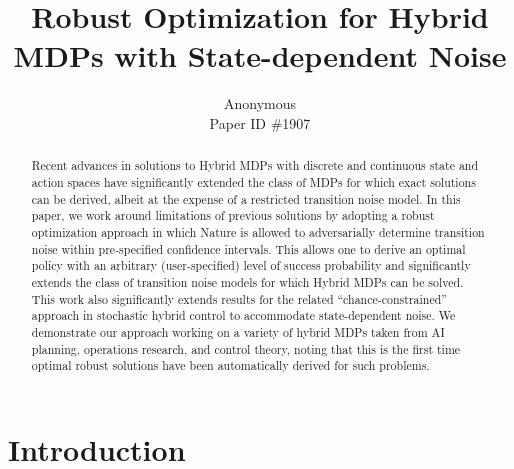 \documentclass{article}
\title{	Robust Optimization for Hybrid MDPs with State-dependent Noise }
\author{Anonymous\\
Paper ID \#1907}%
\begin{document}
\maketitle

\begin{abstract}
Recent advances in solutions to Hybrid MDPs with discrete and
continuous state and action spaces have significantly extended the
class of MDPs for which exact solutions can be derived, albeit at the
expense of a restricted transition noise model.  In this paper, we
work around limitations of previous solutions by adopting a robust
optimization approach in which Nature is allowed to adversarially
determine transition noise within pre-specified confidence
intervals.  This allows one to derive an optimal policy with an
arbitrary (user-specified) level of success probability and
significantly extends the class of transition noise models for which
Hybrid MDPs can be solved.  This work also significantly extends
results for the related ``chance-constrained'' approach in stochastic
hybrid control to accommodate state-dependent noise.  We demonstrate
our approach working on a variety of hybrid MDPs taken from AI
planning, operations research, and control theory, noting that this is
the first time optimal robust solutions have been automatically
derived for such problems.
\end{abstract}

\section{Introduction}
\end{document}

